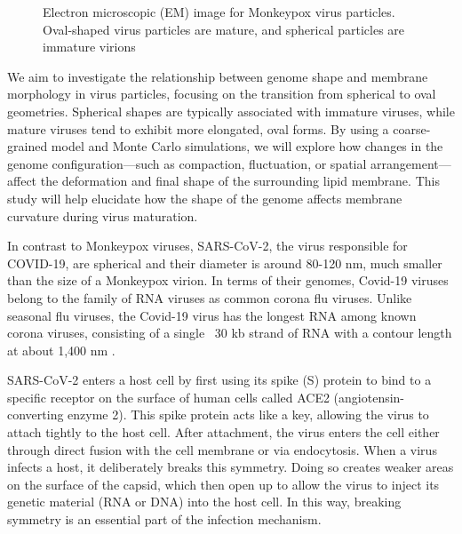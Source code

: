 \documentclass[12pt]{article}
\begin{document}
\begin{flushleft}
\begin{figure}[!ht]
  \centering  
  \caption{Electron microscopic (EM) image for
Monkeypox virus particles. Oval-shaped
virus particles are mature, and spherical
particles are immature virions \cite{goldsmith2003monkeypox}}
\end{figure}

We aim to investigate the relationship between genome shape and membrane morphology in virus particles, focusing on the transition from spherical to oval geometries. Spherical shapes are typically associated with immature viruses, while mature viruses tend to exhibit more elongated, oval forms. By using a coarse-grained model and Monte Carlo simulations, we will explore how changes in the genome configuration—such as compaction, fluctuation, or spatial arrangement—affect the deformation and final shape of the surrounding lipid membrane. This study will help elucidate how the shape of the genome affects membrane curvature during virus maturation.





In contrast to Monkeypox viruses, SARS-CoV-2, the virus responsible for COVID-19, are spherical and their diameter is around 80-120 nm, much smaller than the size of a Monkeypox virion. In terms of
their genomes, Covid-19 viruses belong to the family of
RNA viruses as common corona flu viruses. Unlike
seasonal flu viruses, the Covid-19 virus has the longest
RNA among known corona viruses, consisting of a single
~30 kb strand of RNA with a contour length at about
1,400 nm \cite{baron2020sars}\cite{Wu2022}.

SARS-CoV-2 enters a host cell by first using its spike (S) protein to bind to a specific receptor on the surface of human cells called ACE2 (angiotensin-converting enzyme 2). This spike protein acts like a key, allowing the virus to attach tightly to the host cell. After attachment, the virus enters the cell either through direct fusion with the cell membrane or via endocytosis. 
When a virus infects a host, it deliberately breaks this symmetry. Doing so creates weaker areas on the surface of the capsid, which then open up to allow the virus to inject its genetic material (RNA or DNA) into the host cell. In this way, breaking symmetry is an essential part of the infection mechanism.\\



\end{flushleft}
\end{document}
